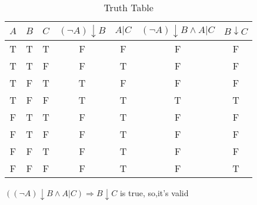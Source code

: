 \documentclass[12pt]{article}
\begin{document}
\begin{enumerate}[(i)]
\begin{table}[H]
\begin{tabular}{|c|c|c|c|c|c|c|}
\hline
$A$ & $B$ &$C$ &$(\neg A)\downarrow B$ &$A|C$&$(\neg A)\downarrow B\wedge A|C$ &$B\downarrow C$\\ \hline
T & T &T  &F &F &F&F  \\ \hline
T & T &F  &F &T &F&F\\ \hline
T & F &T  &T &F &F&F\\ \hline
T & F &F  &T &T &T&T\\ \hline
F & T &T  &F &T &F&F\\ \hline
F & T &F  &F &T &F&F\\ \hline
F & F &T  &F &T &F&F\\ \hline
F & F &F  &F &T &F&T\\ \hline
\end{tabular}
\caption{Truth Table}
\end{table}
$((\neg A)\downarrow B\wedge A|C)\Rightarrow B\downarrow C$ is true, so,it's valid
\end{enumerate}
\end{document}
